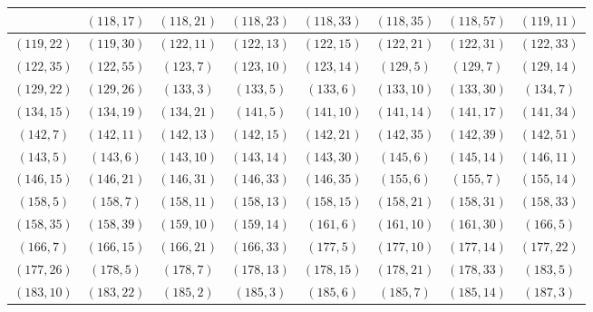 \documentclass[11pt,reqno]{amsart}
\theoremstyle{definition}
\begin{document}
\begin{longtable}{|c|c|c|c|c|c|c|c|}
 & 
$ ( 118 , 17 )$
 & 
$ ( 118 , 21 )$
 & 
$ ( 118 , 23 )$
 & 
$ ( 118 , 33 )$
 & 
$ ( 118 , 35 )$
 & 
$ ( 118 , 57 )$
 & 
$ ( 119 , 11 )$
\\ \hline
$ ( 119 , 22 )$
 & 
$ ( 119 , 30 )$
 & 
$ ( 122 , 11 )$
 & 
$ ( 122 , 13 )$
 & 
$ ( 122 , 15 )$
 & 
$ ( 122 , 21 )$
 & 
$ ( 122 , 31 )$
 & 
$ ( 122 , 33 )$
\\ \hline
$ ( 122 , 35 )$
 & 
$ ( 122 , 55 )$
 & 
$ ( 123 , 7 )$
 & 
$ ( 123 , 10 )$
 & 
$ ( 123 , 14 )$
 & 
$ ( 129 , 5 )$
 & 
$ ( 129 , 7 )$
 & 
$ ( 129 , 14 )$
\\ \hline
$ ( 129 , 22 )$
 & 
$ ( 129 , 26 )$
 & 
$ ( 133 , 3 )$
 & 
$ ( 133 , 5 )$
 & 
$ ( 133 , 6 )$
 & 
$ ( 133 , 10 )$
 & 
$ ( 133 , 30 )$
 & 
$ ( 134 , 7 )$
\\ \hline
$ ( 134 , 15 )$
 & 
$ ( 134 , 19 )$
 & 
$ ( 134 , 21 )$
 & 
$ ( 141 , 5 )$
 & 
$ ( 141 , 10 )$
 & 
$ ( 141 , 14 )$
 & 
$ ( 141 , 17 )$
 & 
$ ( 141 , 34 )$
\\ \hline
$ ( 142 , 7 )$
 & 
$ ( 142 , 11 )$
 & 
$ ( 142 , 13 )$
 & 
$ ( 142 , 15 )$
 & 
$ ( 142 , 21 )$
 & 
$ ( 142 , 35 )$
 & 
$ ( 142 , 39 )$
 & 
$ ( 142 , 51 )$
\\ \hline
$ ( 143 , 5 )$
 & 
$ ( 143 , 6 )$
 & 
$ ( 143 , 10 )$
 & 
$ ( 143 , 14 )$
 & 
$ ( 143 , 30 )$
 & 
$ ( 145 , 6 )$
 & 
$ ( 145 , 14 )$
 & 
$ ( 146 , 11 )$
\\ \hline
$ ( 146 , 15 )$
 & 
$ ( 146 , 21 )$
 & 
$ ( 146 , 31 )$
 & 
$ ( 146 , 33 )$
 & 
$ ( 146 , 35 )$
 & 
$ ( 155 , 6 )$
 & 
$ ( 155 , 7 )$
 & 
$ ( 155 , 14 )$
\\ \hline
$ ( 158 , 5 )$
 & 
$ ( 158 , 7 )$
 & 
$ ( 158 , 11 )$
 & 
$ ( 158 , 13 )$
 & 
$ ( 158 , 15 )$
 & 
$ ( 158 , 21 )$
 & 
$ ( 158 , 31 )$
 & 
$ ( 158 , 33 )$
\\ \hline
$ ( 158 , 35 )$
 & 
$ ( 158 , 39 )$
 & 
$ ( 159 , 10 )$
 & 
$ ( 159 , 14 )$
 & 
$ ( 161 , 6 )$
 & 
$ ( 161 , 10 )$
 & 
$ ( 161 , 30 )$
 & 
$ ( 166 , 5 )$
\\ \hline
$ ( 166 , 7 )$
 & 
$ ( 166 , 15 )$
 & 
$ ( 166 , 21 )$
 & 
$ ( 166 , 33 )$
 & 
$ ( 177 , 5 )$
 & 
$ ( 177 , 10 )$
 & 
$ ( 177 , 14 )$
 & 
$ ( 177 , 22 )$
\\ \hline
$ ( 177 , 26 )$
 & 
$ ( 178 , 5 )$
 & 
$ ( 178 , 7 )$
 & 
$ ( 178 , 13 )$
 & 
$ ( 178 , 15 )$
 & 
$ ( 178 , 21 )$
 & 
$ ( 178 , 33 )$
 & 
$ ( 183 , 5 )$
\\ \hline
$ ( 183 , 10 )$
 & 
$ ( 183 , 22 )$
 & 
$ ( 185 , 2 )$
 & 
$ ( 185 , 3 )$
 & 
$ ( 185 , 6 )$
 & 
$ ( 185 , 7 )$
 & 
$ ( 185 , 14 )$
 & 
$ ( 187 , 3 )$
\\ \hline

\end{longtable}
\end{document}
